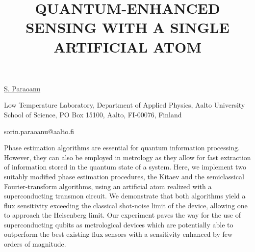 \title{QUANTUM-ENHANCED SENSING WITH A SINGLE ARTIFICIAL ATOM}

\underline{S. Paraoanu} 

{\normalsize{\vspace{-4mm}
Low Temperature Laboratory, Department of Applied Physics, Aalto University School of Science, PO Box 15100, Aalto, FI-00076, Finland



\email sorin.paraoanu@aalto.fi}}

Phase estimation algorithms are essential for quantum information processing. However, they can also be employed in metrology as they allow for fast extraction of information stored in the quantum state of a system. Here, we implement two suitably modified phase estimation procedures, the Kitaev and the semiclassical Fourier-transform algorithms, using an artificial atom realized with a superconducting transmon circuit. We demonstrate that both algorithms yield a flux sensitivity exceeding the classical shot-noise limit of the device, allowing one to approach the Heisenberg limit. Our experiment paves the way for the use of superconducting qubits as metrological devices which are potentially able to outperform the best existing flux sensors with a sensitivity enhanced by few orders of magnitude.

\vspace{\baselineskip}